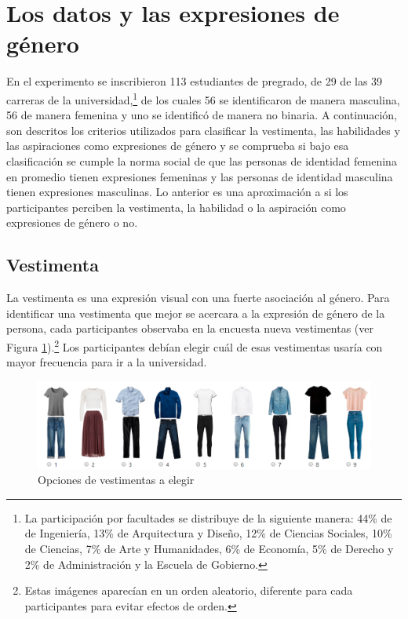 \section{Los datos y las expresiones de género}
En el experimento se inscribieron 113 estudiantes de pregrado, de 29 de las 39 carreras de la universidad,\footnote{La participación por facultades se distribuye de la siguiente manera: 44\% de de Ingeniería, 13\% de Arquitectura y Diseño, 12\% de Ciencias Sociales, 10\% de Ciencias, 7\% de Arte y Humanidades, 6\% de Economía, 5\% de Derecho y 2\% de Administración y la Escuela de Gobierno.} de los cuales 56 se identificaron de manera masculina, 56 de manera femenina y uno se identificó de manera no binaria. A continuación, son descritos los criterios utilizados para clasificar la vestimenta, las habilidades y las aspiraciones como expresiones de género y se comprueba si bajo esa clasificación se cumple la norma social de que las personas de identidad femenina en promedio tienen expresiones femeninas y las personas de identidad masculina tienen expresiones masculinas. Lo anterior es una aproximación a si los participantes perciben la vestimenta, la habilidad o la aspiración como expresiones de género o no.

\subsection{Vestimenta} La vestimenta es una expresión visual con una fuerte asociación al género. Para identificar una vestimenta que mejor se acercara a la expresión de género de la persona, cada participantes observaba en la encuesta nueva vestimentas (ver Figura \ref{fig:vestimentas}).\footnote{Estas imágenes aparecían en un orden aleatorio, diferente para cada participantes para evitar efectos de orden.} Los participantes debían elegir cuál de esas vestimentas usaría con mayor frecuencia para ir a la universidad.

\begin{figure}[htbp]
    \centering
    \includegraphics[width=14cm]{Images/vestimentas.png}
    \caption{Opciones de vestimentas a elegir}
    \label{fig:vestimentas}
\end{figure}

